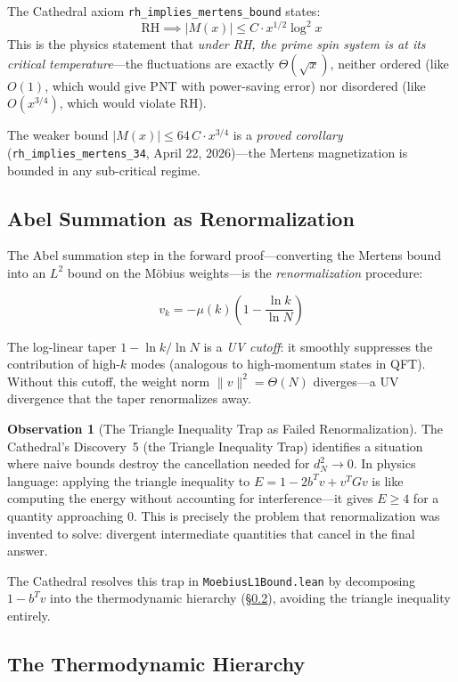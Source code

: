 \documentclass[11pt,a4paper]{article}
\theoremstyle{definition}
\newtheorem{observation}[definition]{Observation}
\newcommand{\RH}{\mathrm{RH}}
\newcommand{\lean}[1]{\texttt{#1}}
\begin{document}
The Cathedral axiom \lean{rh\_implies\_mertens\_bound} states:
\[
  \RH \implies |M(x)| \leq C \cdot x^{1/2} \log^2 x
\]
This is the physics statement that \emph{under RH, the prime spin system
is at its critical temperature}---the fluctuations are exactly
$\Theta(\sqrt{x})$, neither ordered (like $O(1)$, which would give PNT
with power-saving error) nor disordered (like $O(x^{3/4})$, which would
violate RH).

The weaker bound $|M(x)| \leq 64\, C \cdot x^{3/4}$ is a \emph{proved
corollary} (\lean{rh\_implies\_mertens\_34}, April 22, 2026)---the Mertens
magnetization is bounded in any sub-critical regime.

\subsection{Abel Summation as Renormalization}

The Abel summation step in the forward proof---converting the Mertens
bound into an $L^2$ bound on the M\"obius weights---is the
\emph{renormalization} procedure:

\[
  v_k = -\mu(k)\left(1 - \frac{\ln k}{\ln N}\right)
\]

The log-linear taper $1 - \ln k / \ln N$ is a \emph{UV cutoff}: it
smoothly suppresses the contribution of high-$k$ modes (analogous to
high-momentum states in QFT). Without this cutoff, the weight norm
$\|v\|^2 = \Theta(N)$ diverges---a UV divergence that the taper
renormalizes away.

\begin{observation}[The Triangle Inequality Trap as Failed Renormalization]
The Cathedral's Discovery~5 (the Triangle Inequality Trap) identifies
a situation where naive bounds destroy the cancellation needed for
$d_N^2 \to 0$. In physics language: applying the triangle inequality
to $E = 1 - 2b^Tv + v^TGv$ is like computing the energy without
accounting for interference---it gives $E \geq 4$ for a quantity
approaching $0$. This is precisely the problem that renormalization
was invented to solve: divergent intermediate quantities that cancel
in the final answer.

The Cathedral resolves this trap in \lean{MoebiusL1Bound.lean} by
decomposing $1 - b^T v$ into the thermodynamic hierarchy (\S\ref{sec:thermo}),
avoiding the triangle inequality entirely.
\end{observation}

\subsection{The Thermodynamic Hierarchy}
\label{sec:thermo}
\end{document}
